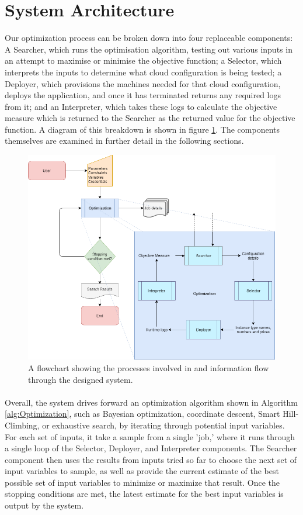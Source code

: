 \documentclass{report}
\begin{document}
\section{System Architecture}
Our optimization process can be broken down into four replaceable components: A Searcher, which runs the optimisation algorithm, testing out various inputs in an attempt to maximise or minimise the objective function; a Selector, which interprets the inputs to determine what cloud configuration is being tested; a Deployer, which provisions the machines needed for that cloud configuration, deploys the application, and once it has terminated returns any required logs from it; and an Interpreter, which takes these logs to calculate the objective measure which is returned to the Searcher as the returned value for the objective function. A diagram of this breakdown is shown in figure \ref{fig:design}. The components themselves are examined in further detail in the following sections.
\begin{figure}[!hb]
  \centering
   \includegraphics[scale=0.5]{Design_flowchart}
  \caption{A flowchart showing the processes involved in and information flow through the designed system.}
  \label{fig:design}
\end{figure}
\newpage
 
\paragraph{}
Overall, the system drives forward an optimization algorithm shown in Algorithm \ref{alg:Optimization}, such as Bayesian optimization, coordinate descent, Smart Hill-Climbing, or exhaustive search, by iterating through potential input variables. For each set of inputs, it take a sample from a single 'job,' where it runs through a single loop of the Selector, Deployer, and Interpreter components. The Searcher component then uses the results from inputs tried so far to choose the next set of input variables to sample, as well as provide the current estimate of the best possible set of input variables to minimize or maximize that result. Once the stopping conditions are met, the latest estimate for the best input variables is output by the system.
\end{document}
